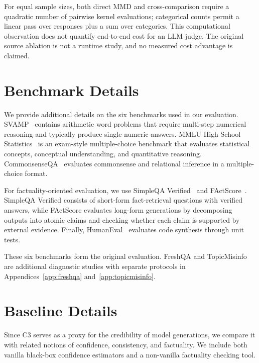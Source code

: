 \documentclass[11pt]{article}
\theoremstyle{plain}
\theoremstyle{definition}
\theoremstyle{remark}
\newif\ifrevisionmarkup
\DeclareRobustCommand{\revisioncolor}{\ifrevisionmarkup\color{red}\fi}
\DeclareRobustCommand{\revised}[1]{{\revisioncolor #1}}
\newenvironment{revision}{\par\begingroup\revisioncolor}{\par\endgroup}
\begin{document}
\begin{revision}
For equal sample sizes, both direct MMD and cross-comparison require a quadratic number of pairwise kernel evaluations; categorical counts permit a linear pass over responses plus a sum over categories. This computational observation does not quantify end-to-end cost for an LLM judge. The original source ablation is not a runtime study, and no measured cost advantage is claimed.
\end{revision}

\section{Benchmark Details}
\label{app:benchmark_details_prompts}

We provide additional details on the six benchmarks used in our evaluation. SVAMP~\citep{patel-etal-2021-nlp} contains arithmetic word problems that require multi-step numerical reasoning and typically produce single numeric answers. MMLU High School Statistics~\citep{hendryckstest2021,hendrycks2021ethics} is an exam-style multiple-choice benchmark that evaluates statistical concepts, conceptual understanding, and quantitative reasoning. CommonsenseQA~\citep{talmor-etal-2019-commonsenseqa} evaluates commonsense and relational inference in a multiple-choice format.

For factuality-oriented evaluation, we use SimpleQA Verified~\citep{haas2025simpleqaverifiedreliablefactuality} and FActScore~\citep{min-etal-2023-factscore}. SimpleQA Verified consists of short-form fact-retrieval questions with verified answers, while FActScore evaluates long-form generations by decomposing outputs into atomic claims and checking whether each claim is supported by external evidence. Finally, HumanEval~\citep{DBLP:journals/corr/abs-2107-03374} evaluates code synthesis through unit tests.

\revised{These six benchmarks form the original evaluation. FreshQA and TopicMisinfo are additional diagnostic studies with separate protocols in Appendices~\ref{app:freshqa} and~\ref{app:topicmisinfo}.}



\section{Baseline Details}
\label{app:baseline_details}

Since C3 serves as a proxy for the credibility of model generations, we compare it with related notions of confidence, consistency, and factuality. We include both vanilla black-box confidence estimators and a non-vanilla factuality checking tool.
\end{document}
